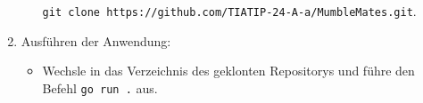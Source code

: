 \begin{enumerate}
\begin{itemize}
        \texttt{git clone https://github.com/TIATIP-24-A-a/MumbleMates.git}.
    \end{itemize}
    
    \item Ausführen der Anwendung:
    \begin{itemize}
        \item Wechsle in das Verzeichnis des geklonten Repositorys und führe den Befehl \texttt{go run .} aus.
    \end{itemize}
\end{enumerate}




